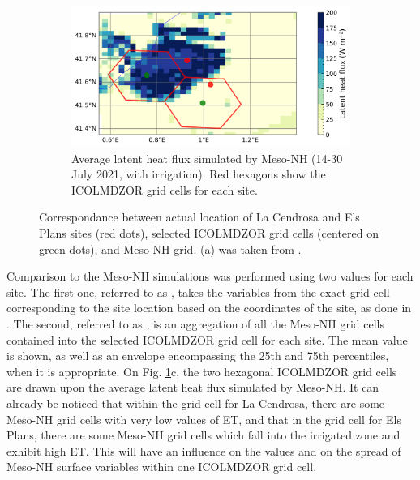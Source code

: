 \begin{figure}[hbtp]
    \begin{subfigure}[t]{0.75\textwidth}
            \caption{Average latent heat flux simulated by Meso-NH (14-30 July 2021, with irrigation). Red hexagons show the ICOLMDZOR grid cells for each site.}
            \includegraphics[width=\textwidth]{images/chap5/liaise_sites_mean_mesoNH.png}
        \end{subfigure} 
    
    \caption{Correspondance between actual location of La Cendrosa and Els Plans sites (red dots), selected ICOLMDZOR grid cells (centered on green dots), and Meso-NH grid. (a) was taken from \citet{lunel_irrigation_2024}.}
    \label{fig:liaise_sites_grid_cells}
\end{figure}

Comparison to the Meso-NH simulations was performed using two values for each site. 
The first one, referred to as \mesoexact, takes the variables from the exact grid cell corresponding to the site location based on the coordinates of the site, as done in \citet{lunel_irrigation_2024}. 
The second, referred to as \mesomean, is an aggregation of all the Meso-NH grid cells contained into the selected ICOLMDZOR grid cell for each site. The mean value is shown, as well as an envelope encompassing the 25th and 75th percentiles, when it is appropriate.
On Fig. \ref{fig:liaise_sites_grid_cells}c, the two hexagonal ICOLMDZOR grid cells are drawn upon the average latent heat flux simulated by Meso-NH. It can already be noticed that within the grid cell for La Cendrosa, there are some Meso-NH grid cells with very low values of ET, and that in the grid cell for Els Plans, there are some Meso-NH grid cells which fall into the irrigated zone and exhibit high ET. This will have an influence on the \mesomean values and on the spread of Meso-NH surface variables within one ICOLMDZOR grid cell. 

